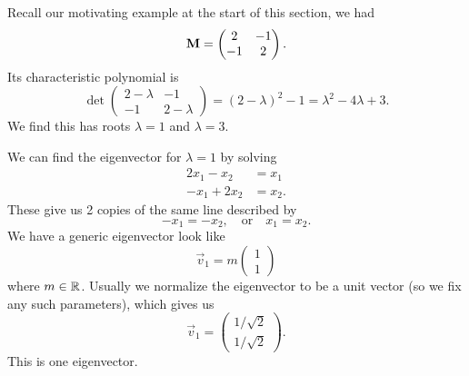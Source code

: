 \begin{example}
Recall our motivating example at the start of this section, we had
\begin{equation}
\mathbf{M} = \begin{pmatrix}2 & -1\\
-1 & 2
\end{pmatrix}.
\end{equation}
Its characteristic polynomial is
\begin{equation}
\det\begin{pmatrix}2-\lambda & -1\\
-1 & 2-\lambda
\end{pmatrix} = (2-\lambda)^{2}-1 = \lambda^{2}-4\lambda+3.
\end{equation}
We find this has roots $\lambda=1$ and $\lambda=3$.

We can find the eigenvector for $\lambda=1$ by solving
\begin{subequations}
  \begin{align}
    2x_{1} -x_{2} &= x_{1}\\
    -x_{1} + 2x_{2} &= x_{2}.
  \end{align}
\end{subequations}
These give us 2 copies of the same line described by
\begin{equation}
-x_{1} = -x_{2},\quad\mbox{or}\quad x_{1}=x_{2}.
\end{equation}
We have a generic eigenvector look like
\begin{equation*}
\vec{v}_{1} = m\begin{pmatrix}1\\1
\end{pmatrix}
\end{equation*}
where $m\in\mathbb{R}$. Usually we normalize the eigenvector to be a unit
vector (so we fix any such parameters), which gives us
\begin{equation}
  \vec{v}_{1} = \begin{pmatrix}1/\sqrt{2}\\
    1/\sqrt{2}
  \end{pmatrix}.
\end{equation}
This is one eigenvector.


\end{example}
